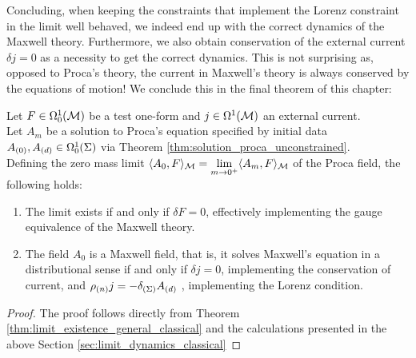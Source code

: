 Concluding, when keeping the constraints that implement the Lorenz constraint in the limit well behaved, we indeed end up with the correct dynamics of the Maxwell theory. Furthermore, we also obtain conservation of the external current $\delta j = 0$ as a necessity to get the correct dynamics. This is not surprising as, opposed to Proca's theory, the current in Maxwell's theory is always conserved by the equations of motion! We conclude this in the final theorem of this chapter:
%
%
%
\begin{theorem}
	Let $F\in \Omega^1_0(\mathcal{M})$ be a test one-form and $j \in \Omega^1(\mathcal{M})$ an external current. \\
	Let $A_m$ be a solution to Proca's equation specified by initial data ${A_{(0)}}, {A_{(d)}} \in \Omega^1_0(\Sigma)$ via Theorem \ref{thm:solution_proca_unconstrained}.	\\
	Defining the zero mass limit $\langle A_0 , F \rangle_{\mathcal{M}} = \lim\limits_{m \to 0^+} \langle A_m, F \rangle_{\mathcal{M}}$ of the Proca field, the following holds:
	\begin{enumerate}
		\item The limit exists if and only if $\delta F = 0$, effectively implementing the gauge equivalence of the Maxwell theory.
		\item The field $A_0$ is a Maxwell field, that is, it solves Maxwell's equation in a distributional sense if and only if $\delta j = 0$, implementing the conservation of current, and $\rho_{(n)} j = - \delta_{(\Sigma)} {A_{(d)}}$ , implementing the Lorenz condition.
	\end{enumerate}
\end{theorem}
\begin{proof}
	The proof follows directly from Theorem \ref{thm:limit_existence_general_classical} and the calculations presented in the above Section \ref{sec:limit_dynamics_classical}
\end{proof}
%
%
%
%
%
%
